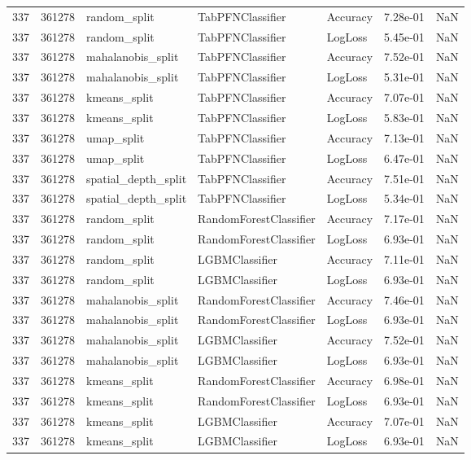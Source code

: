 \begin{tabular}{rrlllrr}
337 & 361278 & random\_split & TabPFNClassifier & Accuracy & 7.28e-01 & NaN \\
337 & 361278 & random\_split & TabPFNClassifier & LogLoss & 5.45e-01 & NaN \\
337 & 361278 & mahalanobis\_split & TabPFNClassifier & Accuracy & 7.52e-01 & NaN \\
337 & 361278 & mahalanobis\_split & TabPFNClassifier & LogLoss & 5.31e-01 & NaN \\
337 & 361278 & kmeans\_split & TabPFNClassifier & Accuracy & 7.07e-01 & NaN \\
337 & 361278 & kmeans\_split & TabPFNClassifier & LogLoss & 5.83e-01 & NaN \\
337 & 361278 & umap\_split & TabPFNClassifier & Accuracy & 7.13e-01 & NaN \\
337 & 361278 & umap\_split & TabPFNClassifier & LogLoss & 6.47e-01 & NaN \\
337 & 361278 & spatial\_depth\_split & TabPFNClassifier & Accuracy & 7.51e-01 & NaN \\
337 & 361278 & spatial\_depth\_split & TabPFNClassifier & LogLoss & 5.34e-01 & NaN \\
337 & 361278 & random\_split & RandomForestClassifier & Accuracy & 7.17e-01 & NaN \\
337 & 361278 & random\_split & RandomForestClassifier & LogLoss & 6.93e-01 & NaN \\
337 & 361278 & random\_split & LGBMClassifier & Accuracy & 7.11e-01 & NaN \\
337 & 361278 & random\_split & LGBMClassifier & LogLoss & 6.93e-01 & NaN \\
337 & 361278 & mahalanobis\_split & RandomForestClassifier & Accuracy & 7.46e-01 & NaN \\
337 & 361278 & mahalanobis\_split & RandomForestClassifier & LogLoss & 6.93e-01 & NaN \\
337 & 361278 & mahalanobis\_split & LGBMClassifier & Accuracy & 7.52e-01 & NaN \\
337 & 361278 & mahalanobis\_split & LGBMClassifier & LogLoss & 6.93e-01 & NaN \\
337 & 361278 & kmeans\_split & RandomForestClassifier & Accuracy & 6.98e-01 & NaN \\
337 & 361278 & kmeans\_split & RandomForestClassifier & LogLoss & 6.93e-01 & NaN \\
337 & 361278 & kmeans\_split & LGBMClassifier & Accuracy & 7.07e-01 & NaN \\
337 & 361278 & kmeans\_split & LGBMClassifier & LogLoss & 6.93e-01 & NaN \\

\end{tabular}
